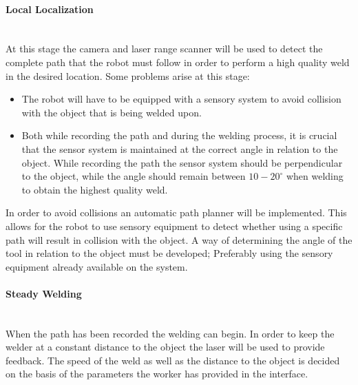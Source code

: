 \paragraph{Local Localization}~\\
At this stage the camera and laser range scanner will be used to detect the complete path that the robot must follow in order to perform a high quality weld in the desired location. Some problems arise at this stage:
\begin{itemize}
	\item[] The robot will have to be equipped with a sensory system to avoid collision with the object that is being welded upon. 
	\item[] Both while recording the path and during the welding process, it is crucial that the sensor system is maintained at the correct angle in relation to the object. While recording the path the sensor system should be perpendicular to the object, while the angle should remain between $10-20^\circ$ when welding to obtain the highest quality weld.
\end{itemize}
In order to avoid collisions an automatic path planner will be implemented. This allows for the robot to use sensory equipment to detect whether using a specific path will result in collision with the object.
A way of determining the angle of the tool in relation to the object must be developed; Preferably using the sensory equipment already available on the system.  
\paragraph{Steady Welding}~\\
When the path has been recorded the welding can begin. In order to keep the welder at a constant distance to the object the laser will be used to provide feedback. The speed of the weld as well as the distance to the object is decided on the basis of the parameters the worker has provided in the interface.
